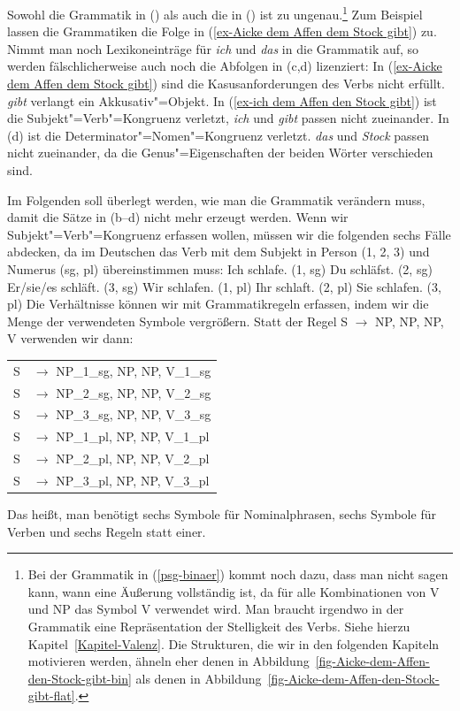 Sowohl die Grammatik in () als auch die in () ist zu ungenau.\footnote{
  Bei der Grammatik in (\ref{psg-binaer}) kommt noch dazu, dass man nicht sagen kann,
  wann eine Äußerung vollständig ist, da für alle Kombinationen von V und NP das Symbol
  V verwendet wird. Man braucht irgendwo in der Grammatik eine Repräsentation der Stelligkeit
  des Verbs. Siehe hierzu Kapitel~\ref{Kapitel-Valenz}. Die Strukturen, die wir in den folgenden
  Kapiteln motivieren werden, ähneln eher denen in Abbildung~\ref{fig-Aicke-dem-Affen-den-Stock-gibt-bin} als denen in Abbildung~\ref{fig-Aicke-dem-Affen-den-Stock-gibt-flat}.%
}
Zum Beispiel lassen die Grammatiken die Folge in (\ref{ex-Aicke dem Affen dem Stock gibt}) zu.
Nimmt man noch Lexikoneinträge für \emph{ich} und \emph{das} in die Grammatik auf, so werden
fälschlicherweise auch noch die Abfolgen in (c,d) lizenziert:
\eal
{}
\zl
In (\ref{ex-Aicke dem Affen dem Stock gibt}) sind die Kasusanforderungen des Verbs nicht erfüllt.
\emph{gibt} verlangt ein Akkusativ"=Objekt. In (\ref{ex-ich dem Affen den Stock gibt}) ist die Subjekt"=Verb"=Kongruenz verletzt, \emph{ich} und \emph{gibt} passen
nicht zueinander. In (d) ist die Determinator"=Nomen"=Kongruenz
verletzt. \emph{das} und \emph{Stock} passen nicht zueinander, da die Genus"=Eigenschaften der
beiden Wörter verschieden sind.

Im Folgenden soll überlegt werden, wie man die Grammatik verändern muss, damit die Sätze in (b--d)
nicht mehr erzeugt werden. Wenn wir Subjekt"=Verb"=Kongruenz erfassen wollen, müssen
wir die folgenden sechs Fälle abdecken, da im Deutschen das Verb mit dem Subjekt in Person (1, 2, 3)
und Numerus (sg, pl) übereinstimmen muss:
\eal\jamwidth=8cm\relax
\ex Ich schlafe.  \jam(1, sg)
\ex Du schläfst.  \jam(2, sg)
\ex Er/sie/es schläft.   \jam(3, sg)
\ex Wir schlafen. \jam(1, pl)
\ex Ihr schlaft.  \jam(2, pl)
\ex Sie schlafen. \jam(3, pl)
\zl
Die Verhältnisse können wir mit Grammatikregeln erfassen, indem wir die Menge der verwendeten
Symbole vergrößern. Statt der Regel S $\to$ NP, NP, NP, V verwenden wir dann:
\ea
\begin{tabular}[t]{@{}l@{ }l}
S  & $\to$ NP\_1\_sg, NP, NP, V\_1\_sg\\
S  & $\to$ NP\_2\_sg, NP, NP, V\_2\_sg\\
S  & $\to$ NP\_3\_sg, NP, NP, V\_3\_sg\\
S  & $\to$ NP\_1\_pl, NP, NP, V\_1\_pl\\
S  & $\to$ NP\_2\_pl, NP, NP, V\_2\_pl\\
S  & $\to$ NP\_3\_pl, NP, NP, V\_3\_pl\\
\end{tabular}
\z
Das heißt, man benötigt sechs Symbole für Nominalphrasen, sechs Symbole für Verben und 
sechs Regeln statt einer.

